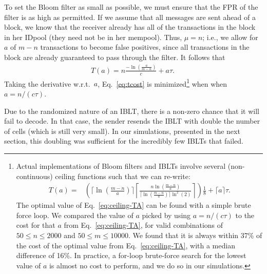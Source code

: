 To set the Bloom filter as small as possible, we must ensure
that the FPR of the filter is as high as permitted. If we assume 
that all \inv messages are sent ahead of a block, we know that the receiver already has all
of the transactions in the block in her IDpool (they need not be in her mempool). 
Thus, $\mu=n$; i.e.,  we allow for $a$ of $m-n$ transactions
to become false positives, since all transactions in the block are
already guaranteed to pass through the filter. It follows that
\vspace{0.5ex}
\begin{align}
T(a) = n\frac{-\ln(\frac{a}{m-n})}{c}+ a\tau.~\label{eq:tcost}
\end{align}
Taking the derivative w.r.t.\ $a$, Eq.~\ref{eq:tcost} is
minimized\footnote{Actual implementations of Bloom filters and IBLTs
  involve several (non-continuous) ceiling functions such that we can re-write:
\vspace{-2ex}
\begin{align}
T(a) =& \left(\lceil\ln(\frac{m-n}{a})\rceil\left\lceil  \frac{n\ln(\frac{m-n}{a})}{\lceil\ln(\frac{m-n}{a})\rceil\ln^2(2)} \right\rceil\right)\frac18 + \lceil a\rceil\tau.\label{eq:ceiling-TA}
\end{align}
The optimal value of Eq.~\ref{eq:ceiling-TA} can be found with a simple brute force
loop.  We compared the value of $a$ picked by using 
$a=n/(c\tau)$ to the cost for that $a$ from Eq.~\ref{eq:ceiling-TA}, for valid combinations of $50\leq n \leq 2000$
and $50\leq m \leq 10000$. We found that it is always within 37\% of
the cost of the optimal value from Eq.~\ref{eq:ceiling-TA}, with a median difference of 16\%. In
practice, a for-loop brute-force search for the lowest value of $a$ is
almost no cost to perform, and we do so in our simulations.}
 when when $a=n/(c\tau)$.



Due to the randomized nature of an IBLT,
there is a non-zero chance that it will fail to decode. In that case,
the sender resends the IBLT with double the number of cells (which is
still very small). In our simulations, presented in the next section,
this doubling was sufficient for the incredibly  few IBLTs that 
failed.

